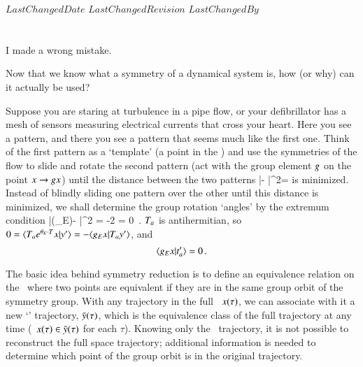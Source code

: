 
{$LastChangedDate$}
{$LastChangedRevision$} {$LastChangedBy$}


\section{\Reducedsp}
\label{sect:reducedStateSp}

\begin{bartlett}
I made a wrong mistake.
\end{bartlett}

\noindent
Now that we know what a symmetry of a dynamical system is, how
(or why) can it actually be used?

Suppose you are staring at turbulence in a pipe flow, or your defibrillator has a mesh of sensors measuring electrical currents that cross your heart. Here you see a pattern, and there you see a pattern that seems much like the first one. Think of the first pattern as a `template' (a point {\slicep} in the \statesp) and use the symmetries of the flow to slide and rotate the second pattern (act with the group element ${g}$ on the point $x \to {\ensuremath{g}}x$) until the distance between the two patterns
\beq
|\LieEl\ssp - \slicep|^2=\braket{\LieEl\ssp - \slicep}{\LieEl\ssp - \slicep}
is minimized. Instead of blindly sliding one pattern over the other until this distance is minimized,
we shall determine the group rotation `angles' by the extremum condition
\beq
{} |\LieEl(\gSpace_E)\ssp - \slicep|^2 =
-2 
 = 0
\,.
$\Lg_a$ is antihermitian, so
$0=\braket{\Lg_a e^{\gSpace_E \cdot \Lg}\ssp}{\slicep}
= - \braket{\LieEl_E \ssp}{\Lg_a  \slicep}$,
and
\[
\braket{\LieEl_E \ssp}{\sliceTan{a}} =0
\,.
\]


The basic idea behind symmetry reduction is to define an equivalence relation on the \statesp\ where two points are equivalent if they are in the same group orbit of the symmetry group. With any trajectory in the full \statesp\, $x(\tau)$, we can associate with it a new `\reducedsp' trajectory, $\bar{y}(\tau)$, which is the equivalence class of the full trajectory at any time (\ie\ $x(\tau) \in \bar{y}(\tau)$ for each $\tau$). Knowing only the \reducedsp\ trajectory, it is not possible to reconstruct the full space trajectory; additional information is needed to determine which point of the group orbit is in the original trajectory.

